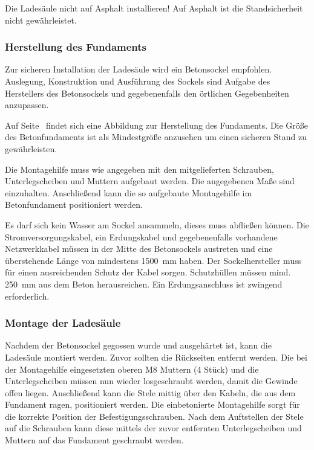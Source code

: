 \documentclass[a4paper,10pt]{article}
\newcommand{\hint}[1]{\begin{tcolorbox}[colback=boxgray,colframe=black,coltext=
white,title=Hinweis]#1\end{tcolorbox}}
\begin{document}
\begin{multicols*}{2}
    \hint{Die Ladesäule nicht auf Asphalt installieren! Auf Asphalt ist die
	Standsicherheit nicht gewährleistet.}


	\subsubsection{Herstellung des Fundaments}
    Zur sicheren Installation der Ladesäule wird ein Betonsockel empfohlen.
	Auslegung, Konstruktion und Ausführung des Sockels sind Aufgabe des
	Herstellers des Betonsockels und gegebenenfalls den örtlichen Gegebenheiten
	anzupassen.

	Auf Seite~\pageref{appendix_base} findet sich eine
	Abbildung zur Herstellung des Fundaments. Die Größe des Betonfundaments ist als
	Mindestgröße anzusehen um einen sicheren Stand zu gewährleisten.

	Die Montagehilfe muss wie angegeben mit den mitgelieferten Schrauben,
	Unterlegscheiben und Muttern aufgebaut werden. Die angegebenen Maße sind
	einzuhalten. Anschließend kann die so aufgebaute Montagehilfe im
	Betonfundament positioniert werden.

	Es darf sich kein Wasser am Sockel ansammeln, dieses muss abfließen können. Die
	Stromversorgungskabel, ein Erdungskabel und gegebenenfalls vorhandene Netzwerkkabel müssen in der Mitte
	des Betonsockels austreten und eine überstehende Länge von mindestens
	\SI{1500}{\milli\meter} haben. Der Sockelhersteller muss
	für einen ausreichenden Schutz der Kabel sorgen. Schutzhüllen müssen mind.
	\SI{250}{\milli\meter} aus dem Beton herausreichen. Ein Erdungsanschluss ist
	zwingend erforderlich.

	\subsubsection{Montage der Ladesäule}
	Nachdem der Betonsockel gegossen wurde und ausgehärtet ist, kann
	die Ladesäule montiert werden. Zuvor sollten die Rückseiten
	entfernt werden. Die bei der Montagehilfe
	eingesetzten oberen M8 Muttern (4 Stück) und die Unterlegscheiben müssen nun wieder losgeschraubt werden,
	damit die Gewinde offen liegen. Anschließend kann die Stele mittig über den
	Kabeln, die aus dem Fundament ragen, positioniert werden. Die
	einbetonierte Montagehilfe sorgt für die korrekte Position der
	Befestigungsschrauben. Nach dem Auftstellen der Stele auf die Schrauben kann diese
	mittels der zuvor entfernten Unterlegscheiben und Muttern auf das Fundament
	geschraubt werden.


\end{multicols*}
\end{document}
